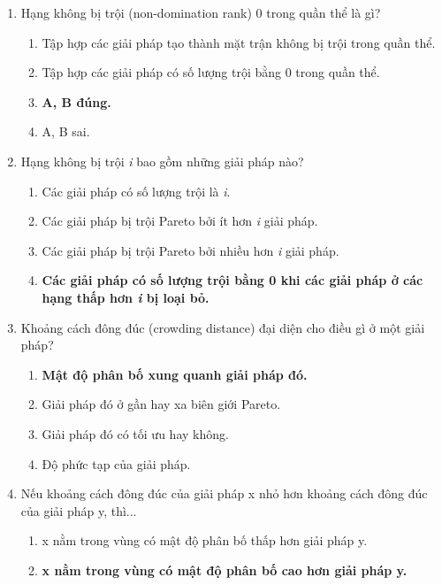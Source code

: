 \documentclass{book}
\begin{document}
\begin{enumerate}
    \item Hạng không bị trội (non-domination rank) 0 trong quần thể là gì?
    \begin{multicols}{2}
        \begin{enumerate}[label=\Alph*]
            \item Tập hợp các giải pháp tạo thành mặt trận không bị trội trong quần thể.
            \item Tập hợp các giải pháp có số lượng trội bằng 0 trong quần thể.
            \item \textbf{A, B đúng.}
            \item A, B sai.
        \end{enumerate}
    \end{multicols}

    \item Hạng không bị trội \textit{i} bao gồm những giải pháp nào?
    \begin{multicols}{2}
        \begin{enumerate}[label=\Alph*]
            \item Các giải pháp có số lượng trội là \textit{i}.
            \item Các giải pháp bị trội Pareto bởi ít hơn \textit{i} giải pháp.
            \item Các giải pháp bị trội Pareto bởi nhiều hơn \textit{i} giải pháp.
            \item \textbf{Các giải pháp có số lượng trội bằng 0 khi các giải pháp ở các hạng thấp hơn \textit{i} bị loại bỏ.}
        \end{enumerate}
    \end{multicols}

    \item Khoảng cách đông đúc (crowding distance) đại diện cho điều gì ở một giải pháp?
    \begin{multicols}{2}
        \begin{enumerate}[label=\Alph*]
            \item \textbf{Mật độ phân bố xung quanh giải pháp đó.}
            \item Giải pháp đó ở gần hay xa biên giới Pareto.
            \item Giải pháp đó có tối ưu hay không.
            \item Độ phức tạp của giải pháp.
        \end{enumerate}
    \end{multicols}

    \item Nếu khoảng cách đông đúc của giải pháp x nhỏ hơn khoảng cách đông đúc của giải pháp y, thì...
    \begin{multicols}{2}
        \begin{enumerate}[label=\Alph*]
            \item x nằm trong vùng có mật độ phân bố thấp hơn giải pháp y.
            \item \textbf{x nằm trong vùng có mật độ phân bố cao hơn giải pháp y.}
        \end{enumerate}
    \end{multicols}


\end{enumerate}
\end{document}
